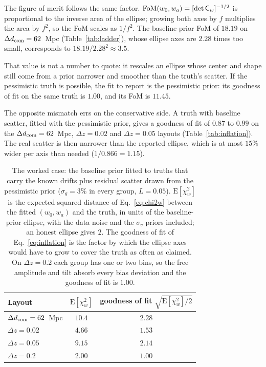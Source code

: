 \documentclass[11pt]{article}
\newcommand{\Cov}{\mathsf{C}}
\begin{document}
The figure of merit follows the same factor.
${\rm FoM}(w_0, w_a) = [\det \Cov_w]^{-1/2}$ is proportional to the
inverse area of the ellipse; growing both axes by $f$ multiplies the
area by $f^2$, so the FoM scales as $1/f^2$.  The baseline-prior FoM of
$18.19$ on $\Delta d_{\rm com} = 62$~Mpc (Table~\ref{tab:ladder}),
whose ellipse axes are $2.28$ times too small, corresponds to
$18.19/2.28^2 \approx 3.5$.

That value is not a number to quote: it rescales an ellipse whose
center and shape still come from a prior narrower and smoother than
the truth's scatter.  If the pessimistic truth is possible, the fit
to report is the pessimistic prior: its goodness of fit on the same truth is
$1.00$, and its FoM is $11.45$.

The opposite mismatch errs on the conservative side.  A truth with
baseline scatter, fitted with the pessimistic prior, gives a
goodness of fit of $0.87$ to $0.99$ on the $\Delta d_{\rm com} = 62$~Mpc,
$\Delta z = 0.02$ and $\Delta z = 0.05$ layouts
(Table~\ref{tab:inflation}).  The real scatter is then narrower than
the reported ellipse, which is at most $15\%$ wider per axis than
needed ($1/0.866 = 1.15$).

\begin{table}[ht]
  \centering
  \begin{tabular}{lcc}
    \hline
    Layout & $\mathrm{E}[\chi^2_w]$ &
    goodness of fit $\sqrt{\mathrm{E}[\chi^2_w]/2}$ \\
    \hline
    $\Delta d_{\rm com} = 62$~Mpc & $10.4$ & $2.28$ \\
    $\Delta z = 0.02$ & $4.66$ & $1.53$ \\
    $\Delta z = 0.05$ & $9.15$ & $2.14$ \\
    $\Delta z = 0.2$  & $2.00$ & $1.00$ \\
    \hline
  \end{tabular}
  \caption{The worked case: the baseline prior fitted to truths that
    carry the known drifts plus residual scatter drawn from the
    pessimistic prior ($\sigma_g = 3\%$ in every group, $L = 0.05$).
    $\mathrm{E}[\chi^2_w]$ is the expected squared distance of
    Eq.~\eqref{eq:chi2w} between the fitted $(w_0, w_a)$ and the
    truth, in units of the baseline-prior ellipse, with the data noise and
    the $\sigma_v$ priors included; an honest ellipse gives $2$.  The
    goodness of fit of Eq.~\eqref{eq:inflation} is the factor by
    which the ellipse axes would have to grow to cover the truth as
    often as claimed.  On $\Delta z = 0.2$ each group has one or two
    bins, so the free amplitude and tilt absorb every bias deviation
    and the goodness of fit is $1.00$.}
  \label{tab:inflationcase}
\end{table}
\end{document}
